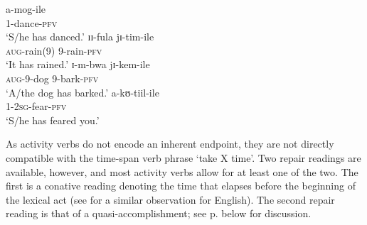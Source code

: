 \begin{exe}
\begin{multicols}{2}
\ex \label{exActivityPFV}
\begin{xlist}
\ex \gll a-mog-ile\\
1-dance-\textsc{pfv}\\
\glt `S/he has danced.'
\ex \gll ɪɪ-fula jɪ-tim-ile\\
\textsc{aug}-rain(9) 9-rain-\textsc{pfv}\\
\glt `It has rained.'
\ex \gll ɪ-m-bwa jɪ-kem-ile\\
\textsc{aug}-9-dog 9-bark-\textsc{pfv}\\
\glt `A/the dog has barked.'
\ex \label{exTiilaPfv}\gll a-kʊ-tiil-ile\\
1-\textsc{2sg}-fear-\textsc{pfv}\\
\glt \lq S/he has feared you.'
\end{xlist}
\end{multicols}
\clearpage
\ex\label{exActivityNotPersPFV} \begin{xlist}
\end{xlist}
\end{exe}

As activity verbs do not encode an inherent endpoint, they are not directly compatible with the time-span verb phrase \lq take X time'. Two repair readings are available, however, and most activity verbs allow for at least one of the two. The first is a conative reading denoting the time that elapses before the beginning of the lexical act (see \citealt[57]{DowtyD1979} for a similar observation for English). The second repair reading is that of a quasi-accomplishment; see p. \pageref{QuasiAccomplishment} below for discussion.

